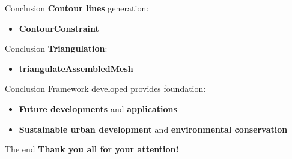 \documentclass[10pt]{beamer}
\begin{document}
\begin{frame}{Conclusion}
  \Large
  \textbf{Contour lines} generation:
  \vspace{1em}
  \begin{itemize}
      \item \textbf{ContourConstraint}
  \end{itemize}
\end{frame}

\begin{frame}{Conclusion}
  \Large
  \textbf{Triangulation}:
  \vspace{1em}
  \begin{itemize}
    \item \textbf{triangulateAssembledMesh}
  \end{itemize}
\end{frame}

\begin{frame}{Conclusion}
  \Large
  Framework developed provides foundation:
  \vspace{1em}
  \begin{itemize}
    \item \textbf{Future developments} and \textbf{applications}
    \item \textbf{Sustainable urban development} and \textbf{environmental conservation}
  \end{itemize}
\end{frame}

\begin{frame}{The end}
  \Large
  \centering
  \textbf{Thank you all for your attention!}
\end{frame}

\nocite{*}


\end{document}
